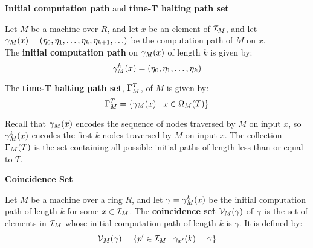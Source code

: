   \begin{definition}{\textbf{Initial computation path} and \textbf{time-T halting path set}}

    Let $M$ be a machine over $R$, and let $x$ be an element of
    $\mathcal{I}_M$, and let $\gamma_M(x) = (\eta_0, \eta_1, \ldots,
    \eta_k, \eta_{k+1}, \ldots)$ be the computation path of $M$ on
    $x$.\\
    
    The \textbf{initial computation path} on $\gamma_M(x)$ of
    length $k$ is given by: 
    $$\gamma_M^k(x) = (\eta_0, \eta_1, \ldots,\eta_k)$$

    The \textbf{time-T halting path set}, $\Gamma_M^T$, of $M$ is
    given by:
    $$\Gamma_M^T = \{\gamma_M(x) \mid x \in \Omega_M(T)\}$$
  \end{definition}

  Recall that $\gamma_M(x)$ encodes the sequence of nodes
  traversed by $M$ on input $x$, so $\gamma_M^k(x)$ encodes the
  first $k$ nodes traversed by $M$ on input $x$.  The collection
  $\Gamma_M(T)$ is the set containing all possible initial paths
  of length less than or equal to $T$.\\

  \begin{definition}{\textbf{Coincidence Set}}

    Let $M$ be a machine over a ring $R$, and let $\gamma =
    \gamma_M^k(x)$ be the initial computation path of length $k$
    for some $x \in \mathcal{I}_M$. The \textbf{coincidence set}
    $\mathcal{V}_M(\gamma)$ of $\gamma$ is the set of
    elements in $\mathcal{I}_M$ whose initial computation path of length
    $k$ is $\gamma$. It is defined by:
    $$\mathcal{V}_M(\gamma) = 
    \{p' \in \mathcal{I}_M \mid \gamma_{x'}(k) = \gamma\}$$
  \end{definition}
    

